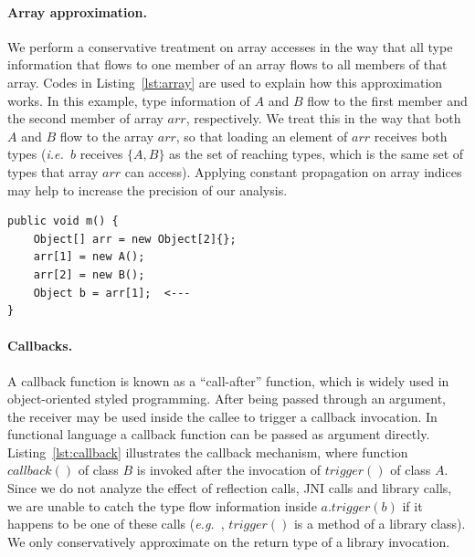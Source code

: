 \documentclass{fac}
\newcommand\eg{\textit{e.g.\ }}
\newcommand\ie{\textit{i.e.\ }}
\begin{document}
\paragraph{Array approximation.} We perform a conservative treatment on array accesses in the way that all type information that flows to one member of an array flows to all members of that array. Codes in Listing~\ref{lst:array} are used to explain how this approximation works. In this example, type information of $A$ and $B$ flow to the first member and the second member of array $arr$, respectively. We treat this in the way that both $A$ and $B$ flow to the array $arr$, so that loading an element of $arr$ receives both types (\ie $b$ receives $\{A, B\}$ as the set of reaching types, which is the same set of types that array $arr$ can access). Applying constant propagation on array indices may help to increase the precision of our analysis.

\begin{lstlisting}[caption={Example code for array accesses},label={lst:array}]
public void m() {
	Object[] arr = new Object[2]{};
	arr[1] = new A();
	arr[2] = new B();
	Object b = arr[1];  <---
}
\end{lstlisting}

\paragraph{Callbacks.} A callback function is known as a ``call-after'' function, which is widely used in object-oriented styled programming. After being passed through an argument, the receiver may be used inside the callee to trigger a callback invocation. In functional language a callback function can be passed as argument directly. Listing~\ref{lst:callback}
illustrates the callback mechanism, where function $callback()$ of class $B$ is invoked after the invocation of $trigger()$ of class $A$. Since we do not analyze the effect of reflection calls, JNI calls and library calls, we are unable to catch the type flow information inside $a.trigger(b)$ if it happens to be one of these calls (\eg, $trigger()$ is a method of a library class). We only conservatively approximate on the return type of a library invocation. %
\end{document}
